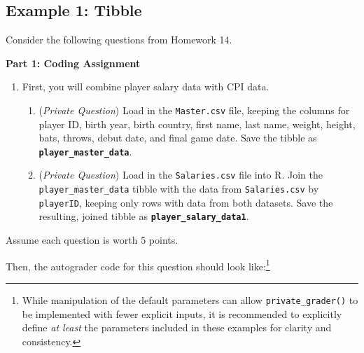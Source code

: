 \documentclass[
  12pt,
]{book}
\begin{document}
\subsection*{Example 1: Tibble}\label{example-1-tibble}

Consider the following questions from Homework 14.

\textbf{Part 1: Coding Assignment}

\begin{enumerate}
\def\labelenumi{\arabic{enumi}.}
\item
  First, you will combine player salary data with CPI data.

  \begin{enumerate}
  \def\labelenumii{(\alph{enumii})}
  \item
    (\emph{Private Question}) Load in the \texttt{Master.csv} file, keeping the columns for player ID, birth year, birth country, first name, last name, weight, height, bats, throws, debut date, and final game date. Save the tibble as \textbf{\texttt{player\_master\_data}}.
  \item
    (\emph{Private Question}) Load in the \texttt{Salaries.csv} file into R. Join the \texttt{player\_master\_data} tibble with the data from \texttt{Salaries.csv} by \texttt{playerID}, keeping only rows with data from both datasets. Save the resulting, joined tibble as \textbf{\texttt{player\_salary\_data1}}.
  \end{enumerate}
\end{enumerate}

Assume each question is worth 5 points.

Then, the autograder code for this question should look like:\footnote{While manipulation of the default parameters can allow \texttt{private\_grader()} to be implemented with fewer explicit inputs, it is recommended to explicitly define \emph{at least} the parameters included in these examples for clarity and consistency.}
\end{document}
